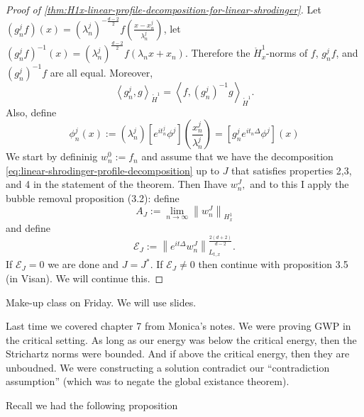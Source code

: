 \documentclass{article}
\newcommand\norm[1]{\left\lVert#1\right\rVert}
\begin{document}
\begin{proof}[Proof of \cref{thm:H1x-linear-profile-decomposition-for-linear-shrodinger}]
  Let $(g_{n}^{j}f)(x)= \left( \lambda_{n}^{j} \right)^{-\frac{d-2}{2}}f \left(
    \frac{x-x_{n}^{j}}{\lambda_{n}^{j}} \right) $, let $(g^{j}_{n}f)^{-1}(x)=
  \left( \lambda_{n}^{j} \right)^{\frac{d-2}{2}}f(\lambda_{n}x+x_{n}) $.
  Therefore the $\mathring{H}_{x}^{1}$-norms of $f$, $g_{n}^{j}f $, and
  $(g_{n}^{j})^{-1}f$ are all equal. Moreover,
  \begin{equation*}
    \left\langle g_{n}^{j},g \right\rangle_{\mathring{H}^{1}} = \left\langle f, (g_{n}^{j})^{-1}g \right\rangle_{\mathring{H}^{1}}.
  \end{equation*}
  Also, define
  \begin{equation*}
    \phi^{j}_{n}(x):= \left( \lambda_{n}^{j} \right) \left[ e^{it_{n}^{j}}\phi^{j} \right] \left( \frac{x_{n}^{j}}{\lambda_{n}^{j}} \right)  = \left[ g_{n}^{j}e^{it_{n}\Delta}\phi^{j} \right] (x)
  \end{equation*}
  We start by defininig $w^{0}_{n}:=f_{n}$ and assume that we have the
  decomposition \cref{eq:linear-shrodinger-profile-decomposition} up to $J$ that
  satisfies properties 2,3, and 4 in the statement of the theorem. Then Ihave
  $w_{n}^{J},$ and to this I apply the bubble removal proposition (3.2): define
  \begin{equation*}
    A_{J} := \lim_{n\to\infty} \norm{w_{n}^{J}}_{H_{x}^{1}}
  \end{equation*}
  and define
  \begin{equation*}
    \mathcal{E}_{J}:= \norm{e^{it\Delta}w_{n}^{J}}_{L_{t,x}}^{\frac{2(d+2)}{d-2}}.
  \end{equation*}
  If $\mathcal{E}_{J}=0$ we are done and $J=J^{*}$. If $\mathcal{E}_{J} \neq 0$
  then continue with proposition 3.5 (in Visan). We will continue this. 
\end{proof}

Make-up class on Friday. We will use slides. 

Last time we covered chapter 7 from Monica's notes. We were proving GWP in the
critical setting. As long as our energy was below the critical energy, then the
Strichartz norms were bounded. And if above the critical energy, then they are
unboudned. We were constructing a solution contradict our ``contradiction
assumption'' (which was to negate the global existance theorem). 

Recall we had the following proposition
\end{document}

